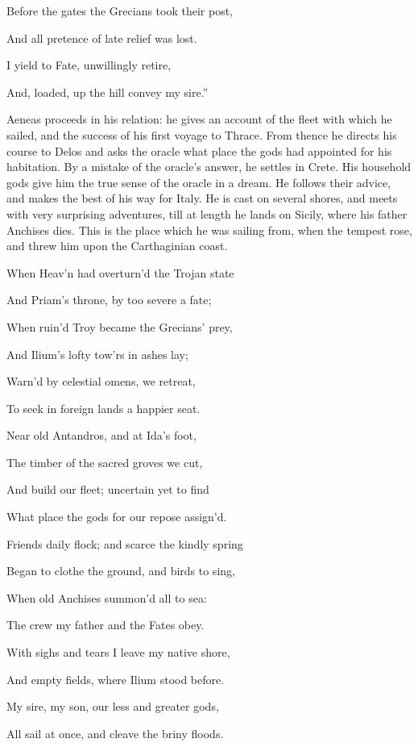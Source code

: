 Before the gates the Grecians took their post,

And all pretence of late relief was lost.

I yield to Fate, unwillingly retire,

And, loaded, up the hill convey my sire.”


Aeneas proceeds in his relation: he gives an account of the fleet with which
he sailed, and the success of his first voyage to Thrace. From thence he
directs his course to Delos and asks the oracle what place the gods had
appointed for his habitation. By a mistake of the oracle’s answer, he
settles in Crete. His household gods give him the true sense of the oracle
in a dream. He follows their advice, and makes the best of his way for Italy.
He is cast on several shores, and meets with very surprising adventures, till
at length he lands on Sicily, where his father Anchises dies. This is the place
which he was sailing from, when the tempest rose, and threw him upon the
Carthaginian coast.

When Heav’n had overturn’d the Trojan state

And Priam’s throne, by too severe a fate;

When ruin’d Troy became the Grecians’ prey,

And Ilium’s lofty tow’rs in ashes lay;

Warn’d by celestial omens, we retreat,

To seek in foreign lands a happier seat.

Near old Antandros, and at Ida’s foot,

The timber of the sacred groves we cut,

And build our fleet; uncertain yet to find

What place the gods for our repose assign’d.

Friends daily flock; and scarce the kindly spring

Began to clothe the ground, and birds to sing,

When old Anchises summon’d all to sea:

The crew my father and the Fates obey.

With sighs and tears I leave my native shore,

And empty fields, where Ilium stood before.

My sire, my son, our less and greater gods,

All sail at once, and cleave the briny floods.

